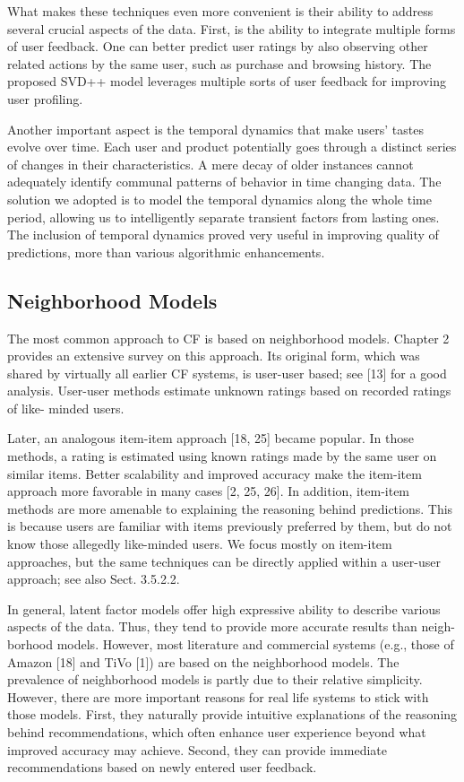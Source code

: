 What makes these techniques even more convenient is their ability to address several crucial aspects of the data. First, is the ability to integrate multiple forms of user feedback. One can better predict user ratings by also observing other related actions by the same user, such as purchase and browsing history. The proposed SVD++ model leverages multiple sorts of user feedback for improving user profiling.

Another important aspect is the temporal dynamics that make users’ tastes evolve over time. Each user and product potentially goes through a distinct series of changes in their characteristics. A mere decay of older instances cannot adequately identify communal patterns of behavior in time changing data. The solution we adopted is to model the temporal dynamics along the whole time period, allowing us to intelligently separate transient factors from lasting ones. The inclusion of temporal dynamics proved very useful in improving quality of predictions, more than various algorithmic enhancements.

\subsection{Neighborhood Models}

The most common approach to CF is based on neighborhood models. Chapter 2 provides an extensive survey on this approach. Its original form, which was shared by virtually all earlier CF systems, is user-user based; see [13] for a good analysis. User-user methods estimate unknown ratings based on recorded ratings of like- minded users.

Later, an analogous item-item approach [18, 25] became popular. In those methods, a rating is estimated using known ratings made by the same user on similar items. Better scalability and improved accuracy make the item-item approach more favorable in many cases [2, 25, 26]. In addition, item-item methods are more amenable to explaining the reasoning behind predictions. This is because users are familiar with items previously preferred by them, but do not know those allegedly like-minded users. We focus mostly on item-item approaches, but the same techniques can be directly applied within a user-user approach; see also Sect. 3.5.2.2.

In general, latent factor models offer high expressive ability to describe various aspects of the data. Thus, they tend to provide more accurate results than neigh- borhood models. However, most literature and commercial systems (e.g., those of Amazon [18] and TiVo [1]) are based on the neighborhood models. The prevalence of neighborhood models is partly due to their relative simplicity. However, there are more important reasons for real life systems to stick with those models. First, they naturally provide intuitive explanations of the reasoning behind recommendations, which often enhance user experience beyond what improved accuracy may achieve. Second, they can provide immediate recommendations based on newly entered user feedback.

